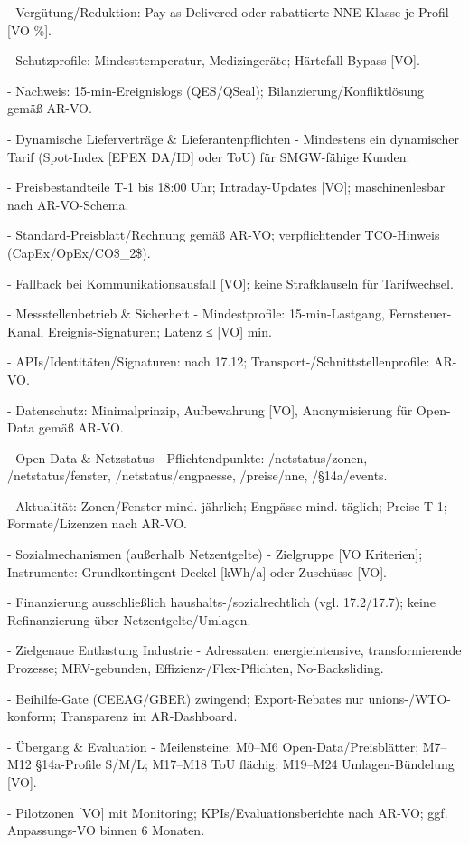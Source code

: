 \documentclass[12pt,a4paper]{scrartcl}
\begin{document}
- Vergütung/Reduktion: Pay-as-Delivered oder rabattierte NNE-Klasse je Profil [VO \%].

- Schutzprofile: Mindesttemperatur, Medizingeräte; Härtefall-Bypass [VO].

- Nachweis: 15-min-Ereignislogs (QES/QSeal); Bilanzierung/Konfliktlösung gemäß AR-VO.

- Dynamische Lieferverträge \& Lieferantenpflichten
- Mindestens ein dynamischer Tarif (Spot-Index [EPEX DA/ID] oder ToU) für SMGW-fähige Kunden.

- Preisbestandteile T-1 bis 18:00 Uhr; Intraday-Updates [VO]; maschinenlesbar nach AR-VO-Schema.

- Standard-Preisblatt/Rechnung gemäß AR-VO; verpflichtender TCO-Hinweis (CapEx/OpEx/CO\$\_2\$).

- Fallback bei Kommunikationsausfall [VO]; keine Strafklauseln für Tarifwechsel.

- Messstellenbetrieb \& Sicherheit
- Mindestprofile: 15-min-Lastgang, Fernsteuer-Kanal, Ereignis-Signaturen; Latenz ≤ [VO] min.

- APIs/Identitäten/Signaturen: nach 17.12; Transport-/Schnittstellenprofile: AR-VO.

- Datenschutz: Minimalprinzip, Aufbewahrung [VO], Anonymisierung für Open-Data gemäß AR-VO.

- Open Data \& Netzstatus
- Pflichtendpunkte: /netstatus/zonen, /netstatus/fenster, /netstatus/engpaesse, /preise/nne, /§14a/events.

- Aktualität: Zonen/Fenster mind. jährlich; Engpässe mind. täglich; Preise T-1; Formate/Lizenzen nach AR-VO.

- Sozialmechanismen (außerhalb Netzentgelte)
- Zielgruppe [VO Kriterien]; Instrumente: Grundkontingent-Deckel [kWh/a] oder Zuschüsse [VO].

- Finanzierung ausschließlich haushalts-/sozialrechtlich (vgl. 17.2/17.7); keine Refinanzierung über Netzentgelte/Umlagen.

- Zielgenaue Entlastung Industrie
- Adressaten: energieintensive, transformierende Prozesse; MRV-gebunden, Effizienz-/Flex-Pflichten, No-Backsliding.

- Beihilfe-Gate (CEEAG/GBER) zwingend; Export-Rebates nur unions-/WTO-konform; Transparenz im AR-Dashboard.

- Übergang \& Evaluation
- Meilensteine: M0--M6 Open-Data/Preisblätter; M7--M12 §14a-Profile S/M/L; M17--M18 ToU flächig; M19--M24 Umlagen-Bündelung [VO].

- Pilotzonen [VO] mit Monitoring; KPIs/Evaluationsberichte nach AR-VO; ggf. Anpassungs-VO binnen 6 Monaten.
\end{document}
